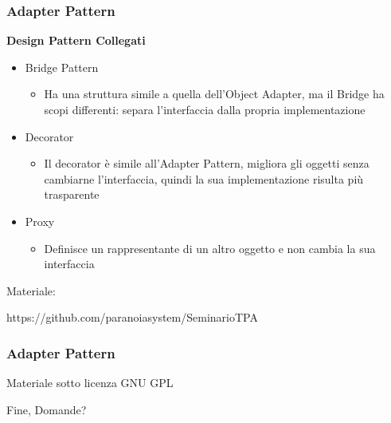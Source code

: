\documentclass[aspectratio=43]{beamer}
\begin{document}
\begin{frame}
	\frametitle{ Adapter Pattern}
	\textbf{Design Pattern Collegati}\pause
	\begin{itemize}
		\item Bridge Pattern\pause
		\begin{itemize}
			\item Ha una struttura simile a quella dell’Object Adapter, ma il Bridge ha scopi differenti: separa l’interfaccia dalla propria implementazione\pause
		\end{itemize}
		\item Decorator\pause
		\begin{itemize}
			\item Il decorator è simile all'Adapter Pattern, migliora gli oggetti senza cambiarne l'interfaccia, quindi la sua implementazione risulta più trasparente \pause
		\end{itemize}
		\item Proxy\pause
		\begin{itemize}
			\item Definisce un rappresentante di un altro oggetto e non cambia la sua interfaccia
		\end{itemize}
	\end{itemize}
\end{frame}



\begin{frame}
    \centerline{Materiale:}
    \centerline{https://github.com/paranoiasystem/SeminarioTPA}
\end{frame}

\begin{frame}
	\frametitle{ Adapter Pattern}
	\centerline{Materiale sotto licenza GNU GPL}\pause
	\begin{figure}[h!]
	\end{figure}
\end{frame}

\begin{frame}
    \centerline{Fine, Domande?}
\end{frame}

\end{document}

